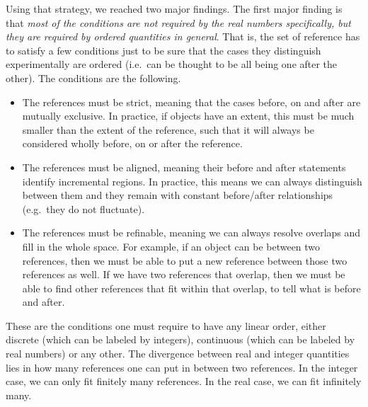 \documentclass[12pt]{iopart}
\begin{document}
Using that strategy, we reached two major findings. The first major finding is that \emph{most of the conditions are not required by the real numbers specifically, but they are required by ordered quantities in general}. That is, the set of reference has to satisfy a few conditions just to be sure that the cases they distinguish experimentally are ordered (i.e.~can be thought to be all being one after the other). The conditions are the following.
\begin{itemize}
	\item The references must be strict, meaning that the cases before, on and after are mutually exclusive. In practice, if objects have an extent, this must be much smaller than the extent of the reference, such that it will always be considered wholly before, on or after the reference.
	\item The references must be aligned, meaning their before and after statements identify incremental regions. In practice, this means we can always distinguish between them and they remain with constant before/after relationships (e.g.~they do not fluctuate). 
	\item The references must be refinable, meaning we can always resolve overlaps and fill in the whole space. For example, if an object can be between two references, then we must be able to put a new reference between those two references as well. If we have two references that overlap, then we must be able to find other references that fit within that overlap, to tell what is before and after.
\end{itemize}
These are the conditions one must require to have any linear order, either discrete (which can be labeled by integers), continuous (which can be labeled by real numbers) or any other. The divergence between real and integer quantities lies in how many references one can put in between two references. In the integer case, we can only fit finitely many references. In the real case, we can fit infinitely many.
\end{document}
